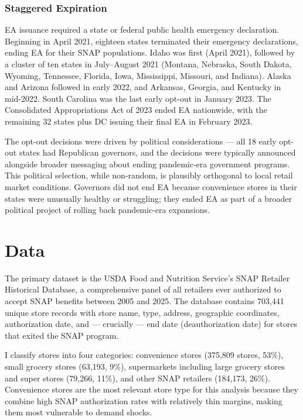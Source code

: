 \documentclass[12pt]{article}
\begin{document}
\subsubsection*{Staggered Expiration} EA issuance required a state or federal public health emergency declaration. Beginning in April 2021, eighteen states terminated their emergency declarations, ending EA for their SNAP populations. Idaho was first (April 2021), followed by a cluster of ten states in July--August 2021 (Montana, Nebraska, South Dakota, Wyoming, Tennessee, Florida, Iowa, Mississippi, Missouri, and Indiana). Alaska and Arizona followed in early 2022, and Arkansas, Georgia, and Kentucky in mid-2022. South Carolina was the last early opt-out in January 2023. The Consolidated Appropriations Act of 2023 ended EA nationwide, with the remaining 32 states plus DC issuing their final EA in February 2023.

The opt-out decisions were driven by political considerations --- all 18 early opt-out states had Republican governors, and the decisions were typically announced alongside broader messaging about ending pandemic-era government programs. This political selection, while non-random, is plausibly orthogonal to local retail market conditions. Governors did not end EA because convenience stores in their states were unusually healthy or struggling; they ended EA as part of a broader political project of rolling back pandemic-era expansions.

\section{Data}

The primary dataset is the USDA Food and Nutrition Service's SNAP Retailer Historical Database, a comprehensive panel of all retailers ever authorized to accept SNAP benefits between 2005 and 2025. The database contains 703,441 unique store records with store name, type, address, geographic coordinates, authorization date, and --- crucially --- end date (deauthorization date) for stores that exited the SNAP program.

I classify stores into four categories: convenience stores (375,809 stores, 53\%), small grocery stores (63,193, 9\%), supermarkets including large grocery stores and super stores (79,266, 11\%), and other SNAP retailers (184,173, 26\%). Convenience stores are the most relevant store type for this analysis because they combine high SNAP authorization rates with relatively thin margins, making them most vulnerable to demand shocks.
\end{document}
